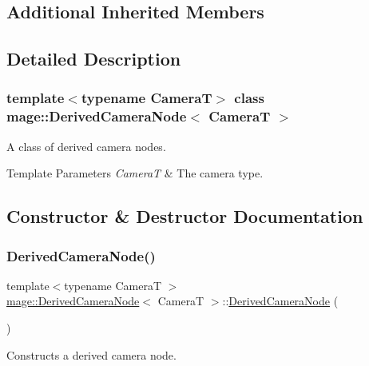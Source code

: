 \subsection*{Additional Inherited Members}


\subsection{Detailed Description}
\subsubsection*{template$<$typename CameraT$>$\newline
class mage\+::\+Derived\+Camera\+Node$<$ Camera\+T $>$}

A class of derived camera nodes.


\begin{DoxyTemplParams}{Template Parameters}
{\em CameraT} & The camera type. \\
\hline
\end{DoxyTemplParams}


\subsection{Constructor \& Destructor Documentation}
\hypertarget{classmage_1_1_derived_camera_node_aa000581c29ef654f09d94ddd392efa72}{}\label{classmage_1_1_derived_camera_node_aa000581c29ef654f09d94ddd392efa72} 
\subsubsection{\texorpdfstring{Derived\+Camera\+Node()}{DerivedCameraNode()}\hspace{0.1cm}{\footnotesize\ttfamily [1/3]}}
{\footnotesize\ttfamily template$<$typename CameraT $>$ \\
\hyperlink{classmage_1_1_derived_camera_node}{mage\+::\+Derived\+Camera\+Node}$<$ CameraT $>$\+::\hyperlink{classmage_1_1_derived_camera_node}{Derived\+Camera\+Node} (\begin{DoxyParamCaption}{ }\end{DoxyParamCaption})}

Constructs a derived camera node. \hypertarget{classmage_1_1_derived_camera_node_ae97b2a006e9e465e2530fdb814e855da}{}\label{classmage_1_1_derived_camera_node_ae97b2a006e9e465e2530fdb814e855da} 

